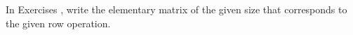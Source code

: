 {\noin In Exercises }
{, write the elementary matrix of the given size that corresponds to the given row operation.}
